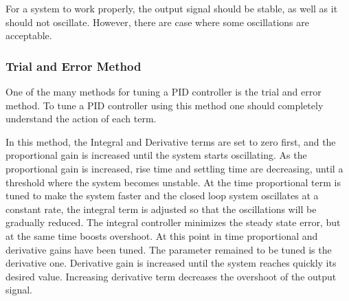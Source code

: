 For a system to work properly, the output signal should be stable, as well as it should not oscillate. However, there are case where some oscillations are acceptable.

\subsubsection*{Trial and Error Method}
One of the many methods for tuning a PID controller is the trial and error method. To tune a PID controller using this method one should completely understand the action of each term.

In this method, the Integral and Derivative terms are set to zero first, and the proportional gain is increased until the system starts oscillating. As the proportional gain is increased, rise time and settling time are decreasing, until a threshold where the system becomes unstable. At the time proportional term is tuned to make the system faster and the closed loop system oscillates at a constant rate,  the integral term is adjusted so that the oscillations will be gradually reduced. The integral controller minimizes the steady state error, but at the same time boosts overshoot. At this point in time proportional and derivative gains have been tuned. The parameter remained to be tuned is the derivative one. Derivative gain is increased  until the system reaches quickly its desired value. Increasing derivative term decreases the overshoot of the output signal.
 

 		